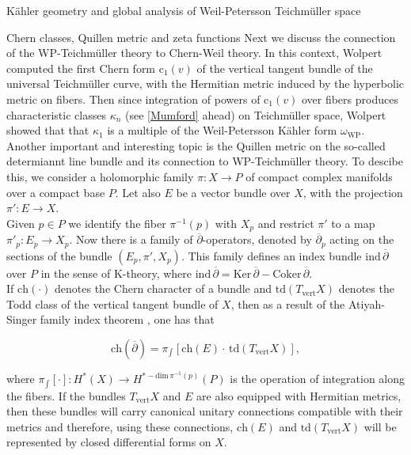 \documentclass[12pt]{amsart}
\theoremstyle{plain}
\theoremstyle{definition}
\theoremstyle{remark}
\numberwithin{equation}{section} %
\numberwithin{figure}{section} %
\begin{document}
\begin{section}{K\"ahler geometry and global analysis of Weil-Petersson Teichm\"uller space}
  \begin{subsection}{Chern classes, Quillen metric and zeta functions}
  \label{se:Chern_Quillen_Zeta}
     Next we discuss the connection of the WP-Teichm\"uller theory to Chern-Weil theory. In this context, Wolpert \cite{Wolpert} 
computed the first Chern form \(\mathrm{c}_{1}(v)\) of the vertical tangent bundle of the universal Teichmüller curve, with the Hermitian metric induced by the
hyperbolic metric on fibers. Then since integration of powers of \(\mathrm{c}_{1}(v)\) over fibers produces characteristic classes \(\kappa_{n}\) (see \eqref{Mumford} ahead) on Teichmüller space, Wolpert showed that
that \(\kappa_{1}\) is a multiple of the Weil-Petersson Kähler form \(\omega_{\mathrm{WP}}\).\\ 


    Another important and interesting topic is the Quillen metric on the so-called determiannt line bundle and its connection to WP-Teichm\"uller theory. To descibe this, we consider a holomorphic family $\pi : X\to P$ of compact complex manifolds over a compact base $P$. Let also $E$ be a vector bundle over $X$, with the projection $\pi': E\to X.$\\

Given $p\in P$ we identify the fiber $\pi^{-1}(p)$ with $X_p$ and restrict $\pi'$ to a map $\pi'_p: E_p \to X_p$. Now there is a family of $\overline{\partial}$-operators, denoted by $\overline{\partial}_p$ acting on the sections of the bundle $(E_p, \pi', X_p )$. This family defines an index bundle $\mathrm{ind}\,\overline{\partial}$ over $P$ in the sense of K-theory, where $\mathrm{ind}\,\overline{\partial}= \mathrm{Ker}\,\overline{\partial}-\mathrm{Coker}\,\overline{\partial}.$\\

If $\mathrm{ch}(\cdot)$ denotes the Chern character of a bundle and $\mathrm{td}(T_{\mathrm{vert}}X)$ denotes the Todd class of the vertical tangent bundle of $X$, then as a result of the Atiyah-Singer family index theorem \cite{AtiyahSinger4}, one has that

\begin{equation}\label{atiyahsinger familyindex}
  \mathrm{ch}(\overline{\partial})=\pi_{\int}[ \mathrm{ch}(E)\cdot\,\mathrm{td}(T_{\mathrm{vert}}X)],
\end{equation}

where $\pi_{\int}[\cdot] : H^{*}(X)\to H^{*-\mathrm{dim}\, \pi^{-1}(p)} (P)$ is the operation of integration along the fibers. If the bundles $T_{\mathrm{vert}}X$ and $E$ are also equipped with  Hermitian metrics, then these bundles will carry canonical unitary connections compatible with their metrics and therefore, using these connections, $\mathrm{ch}(E)$ and $\mathrm{td}(T_{\mathrm{vert}}X)$ will be represented by closed differential forms on $X$.\\


\end{subsection}
\end{section}
\end{document}
